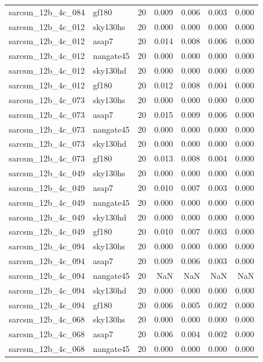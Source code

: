 \begin{tabular}{llrrrrr}
sarcsm\_12b\_4c\_084 & gf180 & 20 & 0.009 & 0.006 & 0.003 & 0.000 \\
sarcsm\_12b\_4c\_012 & sky130hs & 20 & 0.000 & 0.000 & 0.000 & 0.000 \\
sarcsm\_12b\_4c\_012 & asap7 & 20 & 0.014 & 0.008 & 0.006 & 0.000 \\
sarcsm\_12b\_4c\_012 & nangate45 & 20 & 0.000 & 0.000 & 0.000 & 0.000 \\
sarcsm\_12b\_4c\_012 & sky130hd & 20 & 0.000 & 0.000 & 0.000 & 0.000 \\
sarcsm\_12b\_4c\_012 & gf180 & 20 & 0.012 & 0.008 & 0.004 & 0.000 \\
sarcsm\_12b\_4c\_073 & sky130hs & 20 & 0.000 & 0.000 & 0.000 & 0.000 \\
sarcsm\_12b\_4c\_073 & asap7 & 20 & 0.015 & 0.009 & 0.006 & 0.000 \\
sarcsm\_12b\_4c\_073 & nangate45 & 20 & 0.000 & 0.000 & 0.000 & 0.000 \\
sarcsm\_12b\_4c\_073 & sky130hd & 20 & 0.000 & 0.000 & 0.000 & 0.000 \\
sarcsm\_12b\_4c\_073 & gf180 & 20 & 0.013 & 0.008 & 0.004 & 0.000 \\
sarcsm\_12b\_4c\_049 & sky130hs & 20 & 0.000 & 0.000 & 0.000 & 0.000 \\
sarcsm\_12b\_4c\_049 & asap7 & 20 & 0.010 & 0.007 & 0.003 & 0.000 \\
sarcsm\_12b\_4c\_049 & nangate45 & 20 & 0.000 & 0.000 & 0.000 & 0.000 \\
sarcsm\_12b\_4c\_049 & sky130hd & 20 & 0.000 & 0.000 & 0.000 & 0.000 \\
sarcsm\_12b\_4c\_049 & gf180 & 20 & 0.010 & 0.007 & 0.003 & 0.000 \\
sarcsm\_12b\_4c\_094 & sky130hs & 20 & 0.000 & 0.000 & 0.000 & 0.000 \\
sarcsm\_12b\_4c\_094 & asap7 & 20 & 0.009 & 0.006 & 0.003 & 0.000 \\
sarcsm\_12b\_4c\_094 & nangate45 & 20 & NaN & NaN & NaN & NaN \\
sarcsm\_12b\_4c\_094 & sky130hd & 20 & 0.000 & 0.000 & 0.000 & 0.000 \\
sarcsm\_12b\_4c\_094 & gf180 & 20 & 0.006 & 0.005 & 0.002 & 0.000 \\
sarcsm\_12b\_4c\_068 & sky130hs & 20 & 0.000 & 0.000 & 0.000 & 0.000 \\
sarcsm\_12b\_4c\_068 & asap7 & 20 & 0.006 & 0.004 & 0.002 & 0.000 \\
sarcsm\_12b\_4c\_068 & nangate45 & 20 & 0.000 & 0.000 & 0.000 & 0.000 \\

\end{tabular}
